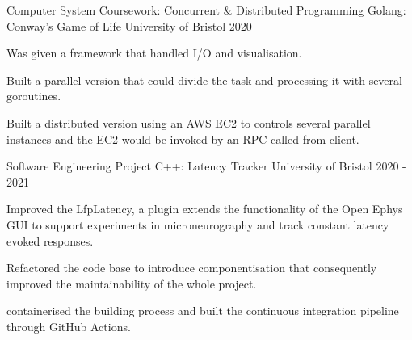 

\begin{cventries}

  \cventry
    {Computer System Coursework: Concurrent \& Distributed Programming} %
    {Golang: Conway's Game of Life} %
    {University of Bristol} %
    {2020} %
    {
      \begin{cvitems} %
        \item {Was given a framework that handled I/O and visualisation.}
        \item {Built a parallel version that could divide the task and processing it with several goroutines.}
        \item {Built a distributed version using an AWS EC2 to controls several parallel instances and the EC2 would be invoked by an RPC called from client.}
      \end{cvitems}
    }

  \cventry
    {Software Engineering Project} %
    {C++: Latency Tracker} %
    {University of Bristol} %
    {2020 - 2021} %
    {
      \begin{cvitems} %
        \item {Improved the LfpLatency, a plugin extends the functionality of the Open Ephys GUI to support experiments in microneurography and track constant latency evoked responses.}
        \item {Refactored the code base to introduce componentisation that consequently improved the maintainability of the whole project.}
        \item {containerised the building process and built the continuous integration pipeline through GitHub Actions.}
      \end{cvitems}
    }


\end{cventries}

